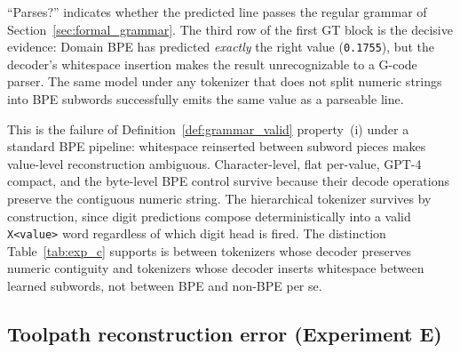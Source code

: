 \documentclass[sensors,article,submit,moreauthors,pdftex]{Definitions/mdpi}
\begin{document}
\begin{table}[htbp]
\smallskip
{\small ``Parses?'' indicates whether the predicted line passes the regular grammar of Section~\ref{sec:formal_grammar}. The third row of the first GT block is the decisive evidence: Domain BPE has predicted \emph{exactly} the right value (\texttt{0.1755}), but the decoder's whitespace insertion makes the result unrecognizable to a G-code parser. The same model under any tokenizer that does not split numeric strings into BPE subwords successfully emits the same value as a parseable line.}
\end{table}

This is the failure of Definition~\ref{def:grammar_valid} property~(i) under a standard BPE pipeline: whitespace reinserted between subword pieces makes value-level reconstruction ambiguous. Character-level, flat per-value, GPT-4 compact, and the byte-level BPE control survive because their decode operations preserve the contiguous numeric string. The hierarchical tokenizer survives by construction, since digit predictions compose deterministically into a valid \texttt{X<value>} word regardless of which digit head is fired. The distinction Table~\ref{tab:exp_c} supports is between tokenizers whose decoder preserves numeric contiguity and tokenizers whose decoder inserts whitespace between learned subwords, not between BPE and non-BPE per se.

\subsection{Toolpath reconstruction error (Experiment E)}
\label{sec:exp_e}
\end{document}
